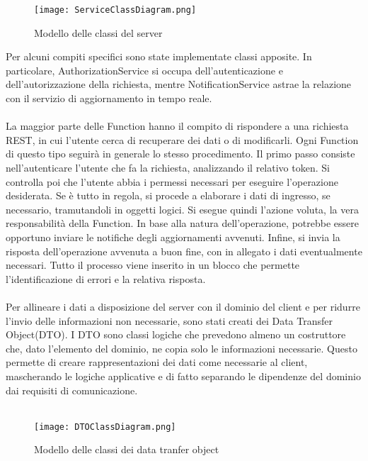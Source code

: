 \begin{figure}[h!]
    \begin{center}
        \texttt{[image: ServiceClassDiagram.png]}
        \caption{Modello delle classi del server}
    \end{center}
\end{figure}
Per alcuni compiti specifici sono state implementate classi apposite.
In particolare, AuthorizationService si occupa dell'autenticazione e dell'autorizzazione della richiesta,
mentre NotificationService astrae la relazione con il servizio di aggiornamento in tempo reale.\\
\\
La maggior parte delle Function hanno il compito di rispondere a una richiesta REST,
in cui l'utente cerca di recuperare dei dati o di modificarli.
Ogni Function di questo tipo seguirà in generale lo stesso procedimento.
Il primo passo consiste nell'autenticare l'utente che fa la richiesta,
analizzando il relativo token.
Si controlla poi che l'utente abbia i permessi necessari per eseguire l'operazione desiderata.
Se è tutto in regola, si procede a elaborare i dati di ingresso, se necessario,
tramutandoli in oggetti logici.
Si esegue quindi l'azione voluta, la vera responsabilità della Function.
In base alla natura dell'operazione,
potrebbe essere opportuno inviare le notifiche degli aggiornamenti avvenuti.
Infine, si invia la risposta dell'operazione avvenuta a buon fine,
con in allegato i dati eventualmente necessari.
Tutto il processo viene inserito in un blocco che permette l'identificazione di errori e
la relativa risposta.\\
\\
Per allineare i dati a disposizione del server con il dominio del client
e per ridurre l'invio delle informazioni non necessarie, sono stati creati dei Data Transfer Object(DTO).
I DTO sono classi logiche che prevedono almeno un costruttore che, dato l'elemento del dominio,
ne copia solo le informazioni necessarie.
Questo permette di creare rappresentazioni dei dati come necessarie al client,
mascherando le logiche applicative e di fatto separando le dipendenze del dominio dai requisiti di comunicazione.\\
\\
\begin{figure}[h!]
    \begin{center}
        \texttt{[image: DTOClassDiagram.png]}
        \caption{Modello delle classi dei data tranfer object}
    \end{center}
\end{figure}

